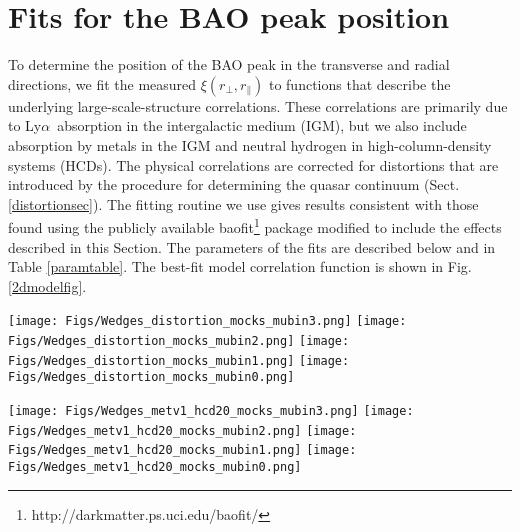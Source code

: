 \documentclass{aa}
\newcommand{\xif}{\xi}
\newcommand{\hMpc}{h^{-1}{\rm Mpc}}
\newcommand{\Lya}{Ly$\alpha$~}
\newcommand{\rperp}{r_\perp}
\newcommand{\rpar}{r_\parallel}
\newcommand{\NHI}{N_{\rm HI}}
\begin{document}
\section{Fits for the BAO peak position}
\label{fitssec}


To determine the position of the BAO peak in the transverse
and radial directions, we fit the measured $\xif(\rperp,\rpar)$
to functions that describe the underlying
large-scale-structure correlations.
These correlations are primarily due to \Lya absorption
in the intergalactic medium (IGM), but
we also include absorption by  
metals in the IGM and neutral hydrogen in high-column-density systems (HCDs).
The physical correlations are corrected for
distortions that are 
introduced by the procedure for determining the quasar continuum
(Sect. \ref{distortionsec}).
The fitting routine we use  gives results consistent with
those found using the publicly available
baofit\footnote{http://darkmatter.ps.uci.edu/baofit/}
package  \citep{2013JCAP...03..024K,2015JCAP...11..034B} modified to
include the effects described in this Section.
The parameters of the fits are described below and
in Table \ref{paramtable}.
The best-fit model correlation function 
is shown in Fig. \ref{2dmodelfig}.



\begin{figure*}[tb]
\centering
\texttt{[image: Figs/Wedges\_distortion\_mocks\_mubin3.png]}
\texttt{[image: Figs/Wedges\_distortion\_mocks\_mubin2.png]}
\texttt{[image: Figs/Wedges\_distortion\_mocks\_mubin1.png]}
\texttt{[image: Figs/Wedges\_distortion\_mocks\_mubin0.png]}
\caption{
Correlation function for the metal-free mocks in four
ranges of $\mu$.
The black  points and curves correspond to mocks with \Lya absorption
but without the addition of a quasar continuum.
The red points and curves correspond to mocks with the
addition of a continuum.
The points correspond to stacks of 100 mocks and the light
curves to individual mocks.  The heavy curves correspond
to the input model of Table \ref{modtable}
(after distortion
by the  matrix $D_{AA^\prime}$ (eqn. \ref{DABeq}) for the red curve). 
}
\label{stackedmocksfig}
\end{figure*}

\begin{figure*}[tb]
\centering
\texttt{[image: Figs/Wedges\_metv1\_hcd20\_mocks\_mubin3.png]}
\texttt{[image: Figs/Wedges\_metv1\_hcd20\_mocks\_mubin2.png]}
\texttt{[image: Figs/Wedges\_metv1\_hcd20\_mocks\_mubin1.png]}
\texttt{[image: Figs/Wedges\_metv1\_hcd20\_mocks\_mubin0.png]}
\caption{
Correlation function for the stack of the 100 mocks in
four ranges of $\mu$.
The red points represent
the measured correlation function of the mocks with metals
and the red curves shows the best fit.
The black points  indicate
the correlation function after including, in addition to metals,  HCDs
unmasked for $\NHI<10^{20}{\rm cm^{-2}}$
and the black curve the best fit.
The peak at $r\sim60~\hMpc$ due to SiIIa and SiIIb is apparent in the range
$\mu>0.95$ but not in the range $0.8<\mu<0.95$.
}
\label{stackedmockswithmetalsfig}
\end{figure*}
\end{document}
